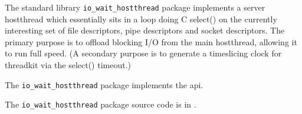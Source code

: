 
The standard library {\tt io\_wait\_hostthread} package implements a server hostthread which 
essentially sits in a loop doing C select() on the currently interesting set of file descriptors, 
pipe descriptors and socket descriptors.  The primary purpose is to offload blocking I/O from 
the main  hostthread, allowing it to run full speed. 
(A secondary purpose is to generate a timeslicing clock for threadkit via the select() timeout.) 

The {\tt io\_wait\_hostthread} package implements the  api.

The {\tt io\_wait\_hostthread} package source code is in .


